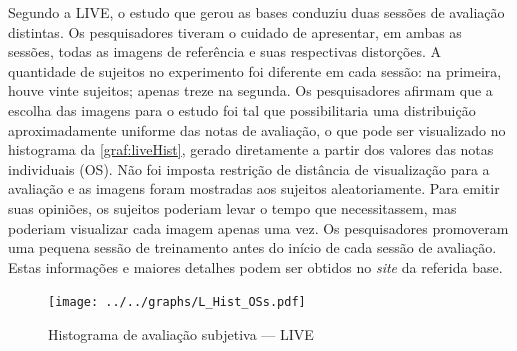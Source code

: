 Segundo a LIVE, o estudo que gerou as bases conduziu duas sessões de avaliação distintas. Os pesquisadores tiveram o cuidado de apresentar, em ambas as sessões, todas as imagens de referência e suas respectivas distorções. A quantidade de sujeitos no experimento foi diferente em cada sessão: na primeira, houve vinte sujeitos; apenas treze na segunda. Os pesquisadores afirmam que a escolha das imagens para o estudo foi tal que possibilitaria uma distribuição aproximadamente uniforme das notas de avaliação, o que pode ser visualizado no histograma da \autoref{graf:liveHist}, gerado diretamente a partir dos valores das notas individuais (OS). Não foi imposta restrição de distância de visualização para a avaliação e as imagens foram mostradas aos sujeitos aleatoriamente. Para emitir suas opiniões, os sujeitos poderiam levar o tempo que necessitassem, mas poderiam visualizar cada imagem apenas uma vez. Os pesquisadores promoveram uma pequena sessão de treinamento antes do início de cada sessão de avaliação. Estas informações e maiores detalhes podem ser obtidos no \emph{site} da referida base.\cite{livedb}

\begin{figure}[htb]
	\centering
	\begin{minipage}{.8\textwidth}
		\caption{Histograma de avaliação subjetiva  --- LIVE}\label{graf:liveHist}
		\centerline{\texttt{[image: ../../graphs/L\_Hist\_OSs.pdf]}}
	\end{minipage}
\end{figure}

